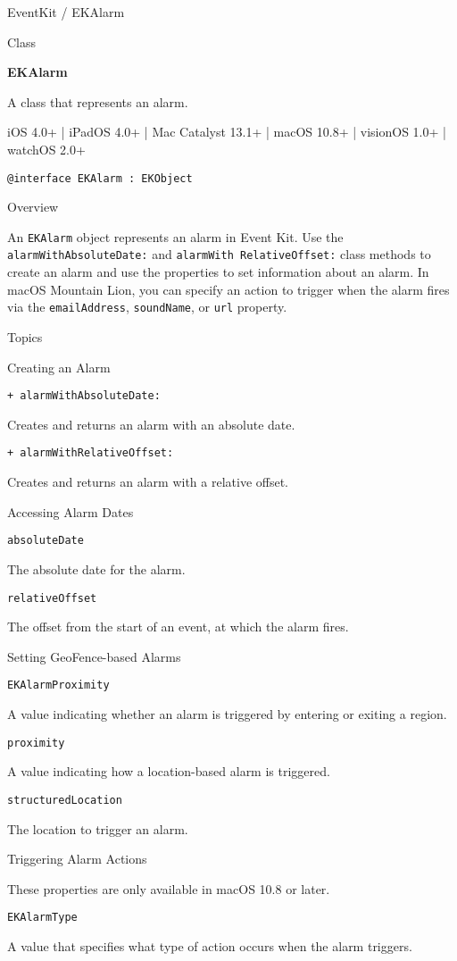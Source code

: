 \documentclass{article}
\title{}
\author{}
\date{}
\begin{document}
EventKit / EKAlarm

Class

\textbf{EKAlarm}

A class that represents an alarm.

iOS 4.0+ | iPadOS 4.0+ | Mac Catalyst 13.1+ | macOS 10.8+ | visionOS 1.0+ | watchOS 2.0+

\texttt{@interface EKAlarm : EKObject}

Overview

An \texttt{EKAlarm} object represents an alarm in Event Kit. Use the \texttt{alarmWithAbsoluteDate:} and \texttt{alarmWith
RelativeOffset:} class methods to create an alarm and use the properties to set information about an alarm.
In macOS Mountain Lion, you can specify an action to trigger when the alarm fires via the \texttt{emailAddress},
\texttt{soundName}, or \texttt{url} property.

Topics

Creating an Alarm

\texttt{+ alarmWithAbsoluteDate:}

Creates and returns an alarm with an absolute date.

\texttt{+ alarmWithRelativeOffset:}

Creates and returns an alarm with a relative offset.

Accessing Alarm Dates

\texttt{absoluteDate}

The absolute date for the alarm.

\texttt{relativeOffset}

The offset from the start of an event, at which the alarm fires.

Setting GeoFence-based Alarms

\texttt{EKAlarmProximity}

A value indicating whether an alarm is triggered by entering or exiting a region.

\texttt{proximity}

A value indicating how a location-based alarm is triggered.

\texttt{structuredLocation}

The location to trigger an alarm.

Triggering Alarm Actions

These properties are only available in macOS 10.8 or later.

\texttt{EKAlarmType}

A value that specifies what type of action occurs when the alarm triggers.
\end{document}
